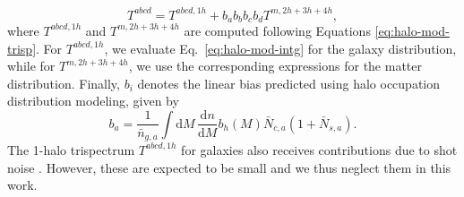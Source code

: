 \documentclass[a4paper,11pt]{article}
\begin{document}
    \begin{equation}
      T^{abcd} = T^{abcd, 1h} + b_{a}b_{b}b_{c}b_{d}T^{m, 2h+3h+4h},
    \end{equation}
    where $T^{abcd, 1h}$ and $T^{m, 2h+3h+4h}$ are computed following Equations \ref{eq:halo-mod-trisp}. For $T^{abcd, 1h}$, we evaluate Eq.~\ref{eq:halo-mod-intg} for the galaxy distribution, while for $T^{m, 2h+3h+4h}$, we use the corresponding expressions for the matter distribution. Finally, $b_{i}$ denotes the linear bias predicted using halo occupation distribution modeling, given by
    \begin{equation}
      b_{a}=\frac{1}{\bar{n}_{g, a}}\int \mathrm{d}M\,\frac{\mathrm{d}n}{\mathrm{d}M}b_{h}(M) \bar{N}_{c, a}(1+\bar{N}_{s, a}).
    \end{equation}
    The 1-halo trispectrum $T^{abcd, 1h}$ for galaxies also receives contributions due to shot noise \cite{Lacasa:2018}. However, these are expected to be small \cite{Lacasa:2018} and we thus neglect them in this work.
\end{document}
